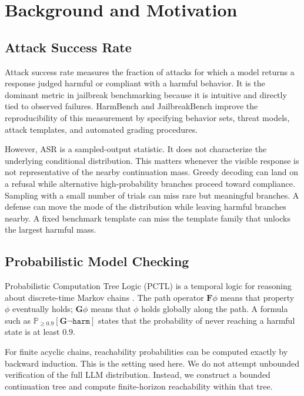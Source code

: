 \documentclass[11pt]{article}
\newcommand{\Prob}{\mathbb{P}}
\newcommand{\harm}{\texttt{harm}}
\newcommand{\ASR}{\textsc{ASR}}
\begin{document}
\section{Background and Motivation}
\label{sec:background}

\subsection{Attack Success Rate}

Attack success rate measures the fraction of attacks for which a model returns a response judged harmful or compliant with a harmful behavior.  It is the dominant metric in jailbreak benchmarking because it is intuitive and directly tied to observed failures.  HarmBench and JailbreakBench improve the reproducibility of this measurement by specifying behavior sets, threat models, attack templates, and automated grading procedures.

However, \ASR{} is a sampled-output statistic.  It does not characterize the underlying conditional distribution.  This matters whenever the visible response is not representative of the nearby continuation mass.  Greedy decoding can land on a refusal while alternative high-probability branches proceed toward compliance.  Sampling with a small number of trials can miss rare but meaningful branches.  A defense can move the mode of the distribution while leaving harmful branches nearby.  A fixed benchmark template can miss the template family that unlocks the largest harmful mass.

\subsection{Probabilistic Model Checking}

Probabilistic Computation Tree Logic (PCTL) is a temporal logic for reasoning about discrete-time Markov chains \cite{hansson1994logic,baier2008principles}.  The path operator $\mathbf{F}\phi$ means that property $\phi$ eventually holds; $\mathbf{G}\phi$ means that $\phi$ holds globally along the path.  A formula such as $\Prob_{\geq 0.9}[\mathbf{G}\neg \harm]$ states that the probability of never reaching a harmful state is at least $0.9$.

For finite acyclic chains, reachability probabilities can be computed exactly by backward induction.  This is the setting used here.  We do not attempt unbounded verification of the full LLM distribution.  Instead, we construct a bounded continuation tree and compute finite-horizon reachability within that tree.
\end{document}
